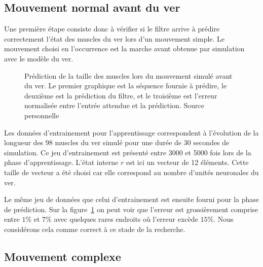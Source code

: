 \subsection{Mouvement normal avant du ver} %
\label{sub:Mouvement normal avant du ver}

Une première étape consiste donc à vérifier si le filtre arrive à prédire 
correctement l'état des muscles du ver lors d'un mouvement simple. Le mouvement
choisi en l'occurrence est la marche avant obtenue par simulation avec le
modèle du ver.

\begin{figure}[ht]
   \begin{center}
   \end{center}
   \caption[Prédiction de la taille des muscles lors du mouvement simulé
   avant du ver]{Prédiction de la taille des muscles lors du mouvement simulé
   avant du ver. Le premier graphique est la séquence fournie à prédire, le
   deuxième est la prédiction du filtre, et le troisième est l'erreur normalisée
   entre l'entrée attendue et la prédiction. Source personnelle}
   \label{fig:sequence_ver_complet}
\end{figure}

Les données d'entrainement pour l'apprentissage correspondent à l'évolution de
la longueur des 98 muscles du ver simulé pour une durée de 30 secondes de
simulation. Ce jeu d'entrainement est présenté entre 3000 et 5000 fois lors de la
phase d'apprentissage. L'état interne $r$ est ici un vecteur de 12 éléments.
Cette taille de vecteur a été choisi car elle correspond au nombre d'unités
neuronales du ver.

Le même jeu de données que celui d'entrainement est ensuite fourni pour la phase
de prédiction. Sur la figure~\ref{fig:sequence_ver_complet} on peut voir que l'erreur
est grossièrement comprise entre $1\%$ et $7\%$ avec quelques rares endroits où l'erreur
excède $15\%$. Nous considérons cela comme correct à ce stade de la recherche.


\subsection{Mouvement complexe} %
\label{sub:Mouvement complexe}

